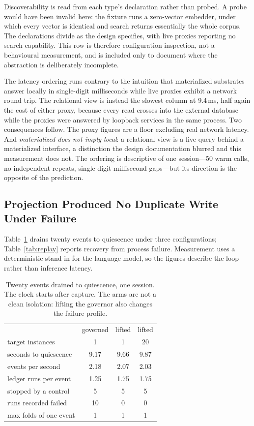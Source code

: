 \documentclass[journal,nofonttune]{IEEEtran}
\begin{document}
Discoverability is read from each type's declaration rather than probed. A
probe would have been invalid here: the fixture runs a zero-vector embedder,
under which every vector is identical and search returns essentially the whole
corpus. The declarations divide as the design specifies, with live proxies
reporting no search capability. This row is therefore configuration
inspection, not a behavioural measurement, and is included only to document
where the abstraction is deliberately incomplete.

The latency ordering runs contrary to the intuition that materialized
substrates answer locally in single-digit milliseconds while live proxies
exhibit a network round trip. The relational view is instead the slowest
column at 9.4\,ms, half again the cost of either proxy, because every read
crosses into the external database while the proxies were answered by loopback
services in the same process. Two consequences follow. The proxy figures are a
floor excluding real network latency. And \emph{materialized does not imply
local}: a relational view is a live query behind a materialized interface, a
distinction the design documentation blurred and this measurement does not.
The ordering is descriptive of one session---50 warm calls, no independent
repeats, single-digit millisecond gaps---but its direction is the opposite of
the prediction.

\subsection{Projection Produced No Duplicate Write Under Failure}
Table~\ref{tab:loop} drains twenty events to quiescence under three
configurations; Table~\ref{tab:replay} reports recovery from process failure.
Measurement uses a deterministic stand-in for the language model, so the
figures describe the loop rather than inference latency.

\begin{table}[!t]
\caption{Twenty events drained to quiescence, one session. The clock starts
after capture. The arms are not a clean isolation: lifting the governor also
changes the failure profile.}
\label{tab:loop}
\centering
\footnotesize
\begin{tabular}{lccc}
\toprule
 & governed & lifted & lifted \\
target instances & 1 & 1 & 20 \\
\midrule
seconds to quiescence  & 9.17 & 9.66 & 9.87 \\
events per second      & 2.18 & 2.07 & 2.03 \\
ledger runs per event  & 1.25 & 1.75 & 1.75 \\
stopped by a control   & 5 & 5 & 5 \\
runs recorded failed   & 10 & 0 & 0 \\
max folds of one event & 1 & 1 & 1 \\
\bottomrule
\end{tabular}
\end{table}
\end{document}
